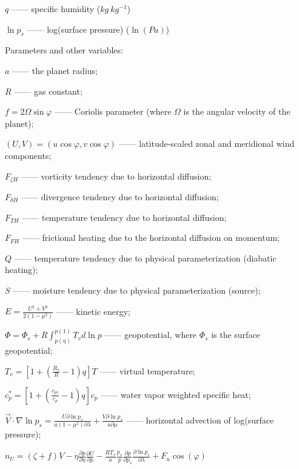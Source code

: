\documentclass[12pt,a4paper]{book}
\begin{document}
\hspace{2 pc}  $q$ ------ specific humidity ($kg \ kg^{-1}$)

\hspace{2 pc}  $\ln p_s$ ------ log(surface pressure) ($\ln(Pa)$)

Parameters and other variables:

$a$ ------ the planet radius;

$R$ ------ gas constant;

$f = 2\Omega \sin \varphi$ ------ Coriolis parameter (where $\Omega$ is the angular velocity of the planet); 

$(U,V) = (u \cos\varphi, v \cos\varphi)$ ------ latitude-scaled zonal and meridional wind components; 

$F_{\zeta H}$ ------ vorticity tendency due to horizontal diffusion;

$F_{\delta H}$ ------ divergence tendency due to horizontal diffusion;

$F_{TH}$ ------ temperature tendency due to horizontal diffusion;

$F_{FH}$ ------ frictional heating due to the horizontal diffusion on momentum;

$Q$ ------ temperature tendency due to physical parameterization (diabatic heating);

$S$ ------ moisture tendency due to physical parameterization (source);

$\displaystyle E = \frac{U^2 + V^2}{2(1-\mu^2)}$ ------ kinetic energy;

$\displaystyle \Phi = \Phi_s + R\int_{p(\eta)}^{p(1)} T_v d\ln p$ ------ geopotential, where $\Phi_s$ is the surface geopotential;

$\displaystyle T_v = \left[ 1 + \left( \frac{R_v}{R} -1 \right)q \right] T$ ------ virtual temperature;

$\displaystyle c_p^* = \left[ 1 + \left( \frac{c_{pv}}{c_p} -1 \right)q \right] c_p$ ------ water vapor weighted specific heat;

$\displaystyle \vec{V} \cdot \nabla \ln p_s = \frac{U \partial \ln p_s}{a(1-\mu^2)\partial \lambda} 
+ \frac{V \partial \ln p_s}{a \partial \mu}$ ------ horizontal advection of log(surface pressure);

$\displaystyle n_U = (\zeta + f)V 
- \dot{\eta}\frac{\partial p}{\partial \eta} \frac{\partial U}{\partial p} 
- \frac{RT_v}{a} \frac{p_s}{p} \frac{\partial p}{\partial p_s} \frac{\partial \ln p_s}{\partial \lambda} 
+ F_u\cos(\varphi)$
\end{document}
